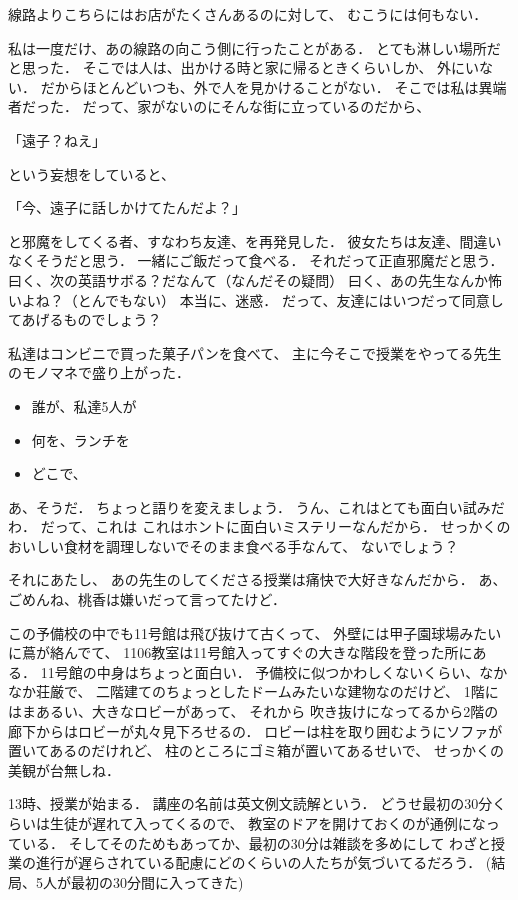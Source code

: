 線路よりこちらにはお店がたくさんあるのに対して、 むこうには何もない．

私は一度だけ、あの線路の向こう側に行ったことがある．
とても淋しい場所だと思った．
そこでは人は、出かける時と家に帰るときくらいしか、 外にいない．
だからほとんどいつも、外で人を見かけることがない．
そこでは私は異端者だった．
だって、家がないのにそんな街に立っているのだから、

「遠子？ねえ」

という妄想をしていると、

「今、遠子に話しかけてたんだよ？」

と邪魔をしてくる者、すなわち友達、を再発見した．
彼女たちは友達、間違いなくそうだと思う． 一緒にご飯だって食べる．
それだって正直邪魔だと思う．
曰く、次の英語サボる？だなんて（なんだその疑問）
曰く、あの先生なんか怖いよね？（とんでもない） 本当に、迷惑．
だって、友達にはいつだって同意してあげるものでしょう？

私達はコンビニで買った菓子パンを食べて、
主に今そこで授業をやってる先生のモノマネで盛り上がった．

\begin{itemize}
\itemsep1pt\parskip0pt
\item
  誰が、私達5人が
\item
  何を、ランチを
\item
  どこで、
\end{itemize}

あ、そうだ． ちょっと語りを変えましょう．
うん、これはとても面白い試みだわ． だって、これは
これはホントに面白いミステリーなんだから．
せっかくのおいしい食材を調理しないでそのまま食べる手なんて、
ないでしょう？

それにあたし、 あの先生のしてくださる授業は痛快で大好きなんだから．
あ、ごめんね、桃香は嫌いだって言ってたけど．

この予備校の中でも11号館は飛び抜けて古くって、
外壁には甲子園球場みたいに蔦が絡んでて、
1106教室は11号館入ってすぐの大きな階段を登った所にある．
11号館の中身はちょっと面白い．
予備校に似つかわしくないくらい、なかなか荘厳で、
二階建てのちょっとしたドームみたいな建物なのだけど、
1階にはまあるい、大きなロビーがあって、 それから
吹き抜けになってるから2階の廊下からはロビーが丸々見下ろせるの．
ロビーは柱を取り囲むようにソファが置いてあるのだけれど、
柱のところにゴミ箱が置いてあるせいで、 せっかくの美観が台無しね．

13時、授業が始まる． 講座の名前は英文例文読解という．
どうせ最初の30分くらいは生徒が遅れて入ってくるので、
教室のドアを開けておくのが通例になっている．
そしてそのためもあってか、最初の30分は雑談を多めにして
わざと授業の進行が遅らされている配慮にどのくらいの人たちが気づいてるだろう．
(結局、5人が最初の30分間に入ってきた)

